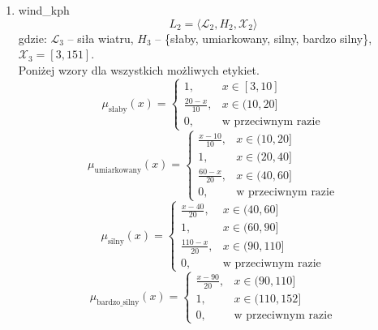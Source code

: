 \documentclass{article}
\begin{document}
\begin{enumerate}
    \item wind\_kph
        \begin{equation}
            L_2 = \langle \mathcal{L}_2, H_2, \mathcal{X}_2 \rangle
        \end{equation}
        gdzie: $\mathcal{L}_3$ – siła wiatru, $H_3$ – \{słaby, umiarkowany, silny, bardzo silny\}, $\mathcal{X}_3 = [3, 151]$. \\
        Poniżej wzory dla wszystkich możliwych etykiet.
                  \begin{equation}
                    \mu_{\text{słaby}}(x) =
                    \begin{cases}
                    1, & x \in [3,  10] \\
                    \frac{20 - x}{10}, & x \in (10, 20] \\
                    0, & \text{w przeciwnym razie}
                    \end{cases}
                  \end{equation}
                \begin{equation}
                    \mu_{\text{umiarkowany}}(x) =
                    \begin{cases}
                    \frac{x - 10}{10}, & x \in (10, 20] \\
                    1, & x \in (20, 40] \\
                    \frac{60 - x}{20}, & x \in (40, 60] \\
                    0, & \text{w przeciwnym razie}
                    \end{cases}
                  \end{equation}
                \begin{equation}
                    \mu_{\text{silny}}(x) =
                    \begin{cases}
                    \frac{x - 40}{20}, & x \in (40, 60] \\
                    1, & x \in (60, 90] \\
                    \frac{110 - x}{20}, & x \in (90, 110] \\
                    0, & \text{w przeciwnym razie}
                    \end{cases}
              \end{equation}
                \begin{equation}
                    \mu_{\text{bardzo\_silny}}(x) =
                    \begin{cases}
                    \frac{x - 90}{20}, & x \in (90, 110] \\
                    1, & x \in (110, 152] \\
                    0, & \text{w przeciwnym razie}
                    \end{cases}
              \end{equation}


\end{enumerate}
\end{document}
